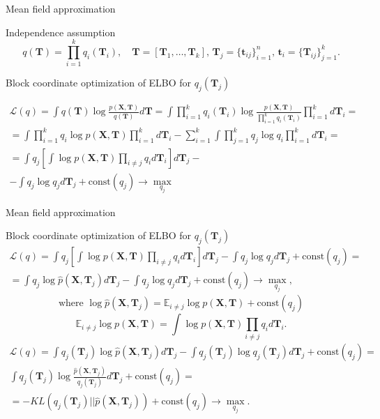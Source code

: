 \documentclass{beamer}
\newcommand{\bt}{\mathbf{t}}
\newcommand{\bT}{\mathbf{T}}
\newcommand{\bX}{\mathbf{X}}
\begin{document}
\begin{frame}{Mean field approximation}
    \begin{block}{Independence assumption}
    \vspace{-0.3cm}
    \[
    q(\bT) = \prod_{i=1}^k q_i(\bT_i), \quad \bT = [\bT_1, \dots, \bT_k], \, \bT_j = \{ \bt_{ij}\}_{i=1}^n, \, \bt_i = \{ \bT_{ij}\}_{j=1}^k.
    \]
    \vspace{-0.3cm}
    \end{block}
    \begin{block}{Block coordinate optimization of ELBO for $q_j(\bT_j)$}
  
    {\footnotesize
    \vspace{-0.3cm}
        \begin{multline*}
    		\mathcal{L} (q)
    		= \int q(\bT) \log \frac{p(\bX, \bT)}{q(\bT)}d\bT
    		= \int \prod_{i=1}^k q_i(\bT_i) \log \frac{p(\bX, \bT)}{\prod_{i=1}^k q_i(\bT_i)}  \prod_{i=1}^k d \bT_i = \\
    		= \int \prod_{i=1}^k q_i \log p(\bX, \bT) \prod_{i=1}^k d \bT_i  
    		- \sum_{i=1}^k \int \prod_{j=1}^k q_j \log q_i \prod_{i=1}^k d \bT_i = \\
    		= \int q_j \left[\int  \log p(\bX, \bT) \prod_{i \neq j} q_i d \bT_i \right] d \bT_j - \\
    		- \int q_j \log q_j d\bT_j + \text{const}(q_j) \rightarrow \max_{q_j}
    	\end{multline*}
        \vspace{-0.3cm}}
    \end{block}
\end{frame}
\begin{frame}{Mean field approximation}
	\footnotesize
	\begin{block}{Block coordinate optimization of ELBO for $q_j(\bT_j)$}
		\vspace{-0.4cm}
	    \begin{multline*}
			\mathcal{L} (q) 
			= \int q_j \left[\int \log p(\bX, \bT) \prod_{i \neq j} q_i d \bT_i \right] d \bT_j
			- \int q_j \log q_j  d\bT_j + \text{const}(q_j) = \\
			= \int q_j \log \hat{p}(\bX, \bT_j) d \bT_j 
			- \int q_j \log q_j d\bT_j + \text{const}(q_j) \rightarrow \max_{q_j},
		\end{multline*}
		\[
		    \text{where } \log \hat{p}(\bX, \bT_j) = \mathbb{E}_{i \neq j} \log p(\bX, \bT) + \text{const}(q_j)
		\]
		\[
		    \mathbb{E}_{i \neq j} \log p(\bX, \bT) = \int \log p(\bX, \bT) \prod_{i \neq j} q_i d \bT_i.
		\]
		\vspace{-0.1cm}
		\begin{multline*}
    		\mathcal{L} (q)
    		= \int q_j (\bT_j) \log \hat{p}(\bX, \bT_j) d \bT_j - \int q_j(\bT_j) \log q_j(\bT_j) d\bT_j + \text{const}(q_j) = \\
    		 \int q_j (\bT_j) \log \frac{\hat{p}(\bX, \bT_j)}{q_j(\bT_j)} d\bT_j + \text{const}(q_j) = \\
    		= - KL (q_j(\bT_j) || \hat{p}(\bX, \bT_j)) + \text{const}(q_j) \rightarrow \max_{q_j}.
    	\end{multline*}
    \end{block}
\end{frame}
\end{document}

